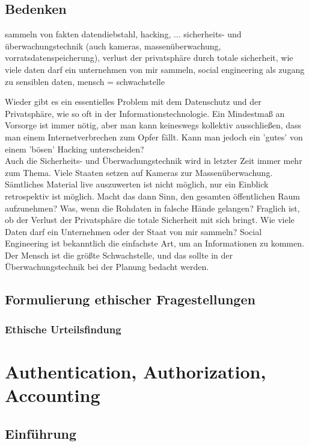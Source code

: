 \documentclass[letterpaper, 12pt]{article}
\let\tempsection\section
\renewcommand\section[1]{\vspace{-0.3cm}\tempsection{#1}\vspace{-0.3cm}}
\let\tempsubsection\subsection
\renewcommand\subsection[1]{\vspace{0cm}\tempsubsection{#1}\vspace{0cm}}
\let\tempsubsubsection\subsubsection
\renewcommand\subsubsection[1]{\vspace{0cm}\tempsubsubsection{#1}\vspace{0cm}}
\begin{document}
\subsection{Bedenken}

sammeln von fakten \newline
datendiebstahl, hacking, ... sicherheits- und überwachungstechnik (auch kameras, massenüberwachung, vorratsdatenspeicherung), verlust der privatsphäre durch totale sicherheit, wie viele daten darf ein unternehmen von mir sammeln, social engineering als zugang zu sensiblen daten, mensch = schwachstelle

Wieder gibt es ein essentielles Problem mit dem Datenschutz und der Privatsphäre, wie so oft in der Informationstechnologie. Ein Mindestmaß an Vorsorge ist immer nötig, aber man kann keineswegs kollektiv ausschließen, dass man einem Internetverbrechen zum Opfer fällt. Kann man jedoch ein 'gutes' von einem 'bösen' Hacking unterscheiden? \\
Auch die Sicherheits- und Überwachungstechnik wird in letzter Zeit immer mehr zum Thema. Viele Staaten setzen auf Kameras zur Massenüberwachung. Sämtliches Material live auszuwerten ist nicht möglich, nur ein Einblick retrospektiv ist möglich. Macht das dann Sinn, den gesamten öffentlichen Raum aufzunehmen? Was, wenn die Rohdaten in falsche Hände gelangen? Fraglich ist, ob der Verlust der Privatsphäre die totale Sicherheit mit sich bringt. Wie viele Daten darf ein Unternehmen oder der Staat von mir sammeln? Social Engineering ist bekanntlich die einfachste Art, um an Informationen zu kommen. Der Mensch ist die größte Schwachstelle, und das sollte in der Überwachungstechnik bei der Planung bedacht werden.

\subsection{Formulierung ethischer Fragestellungen}

\subsubsection{Ethische Urteilsfindung}

\clearpage

\section{Authentication, Authorization, Accounting}

\subsection{Einführung}
\end{document}
